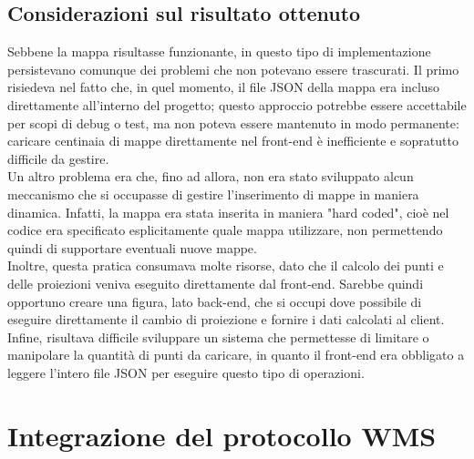 \subsection{Considerazioni sul risultato ottenuto}

Sebbene la mappa risultasse funzionante, in questo tipo di implementazione persistevano comunque dei problemi che non potevano essere trascurati. Il primo risiedeva nel fatto che, in quel momento, il file JSON della mappa era incluso direttamente all'interno del progetto; questo approccio potrebbe essere accettabile per scopi di debug o test, ma non poteva essere mantenuto in modo permanente: caricare centinaia di mappe direttamente nel front-end è inefficiente e sopratutto difficile da gestire. 
\\Un altro problema era che, fino ad allora, non era stato sviluppato alcun meccanismo che si occupasse di gestire l'inserimento di mappe in maniera dinamica. Infatti, la mappa era stata inserita in maniera "hard coded",  cioè nel codice era specificato esplicitamente quale mappa utilizzare, non permettendo quindi di supportare eventuali nuove mappe.
\\Inoltre, questa pratica consumava molte risorse, dato che il calcolo dei punti e delle proiezioni veniva eseguito direttamente dal front-end. Sarebbe quindi opportuno creare una figura, lato back-end, che si occupi dove possibile di eseguire direttamente il cambio di proiezione e fornire i dati calcolati al client. 
\\Infine, risultava difficile sviluppare un sistema che permettesse di limitare o manipolare la quantità di punti da caricare, in quanto il front-end era obbligato a leggere l'intero file JSON per eseguire questo tipo di operazioni.

\section{Integrazione del protocollo WMS}

